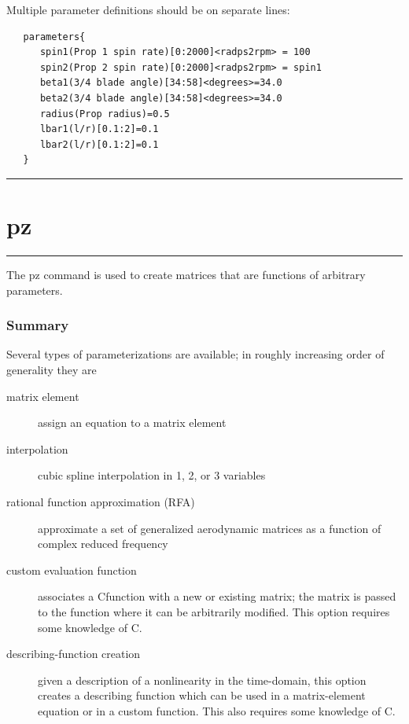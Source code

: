 \documentclass[11pt,openany,twoside]{book}
\makeatletter
\numberwithin{equation}{section}		%
\def\Cpp{{C\nolinebreak[4]\hspace{-.05em}\raisebox{.4ex}{\tiny\bf ++}}\:}
\newcommand{\Cmd}[1]{{\sf #1}}
\newcommand{\Manpg}[1]{
	\hspace{-\parindent}\rule[-5mm]{\textwidth}{0.3mm}
	\newpage
	\section[\Cmd{#1}]{\sf\Large{#1}} \label{ref:#1} \index{#1@\Cmd{#1}!reference}
	\rule[5mm]{\textwidth}{0.3mm}
}
\makeatother
\begin{document}
Multiple parameter definitions should be on separate lines:
\begin{lstlisting}
   parameters{
      spin1(Prop 1 spin rate)[0:2000]<radps2rpm> = 100
      spin2(Prop 2 spin rate)[0:2000]<radps2rpm> = spin1
      beta1(3/4 blade angle)[34:58]<degrees>=34.0
      beta2(3/4 blade angle)[34:58]<degrees>=34.0
      radius(Prop radius)=0.5
      lbar1(l/r)[0.1:2]=0.1
      lbar2(l/r)[0.1:2]=0.1
   }
\end{lstlisting}

\Manpg{pz}

The \Cmd{pz} command is used to create matrices
that are functions of arbitrary parameters.

\subsubsection{Summary}
Several types of parameterizations are available; in roughly increasing
order of generality they are

\begin{description}
\item[matrix element]
   assign an equation to a matrix element
        
\item[interpolation]
   cubic spline interpolation in 1, 2, or 3 variables

\item[rational function approximation (RFA)]
   approximate a set of generalized aerodynamic matrices
   as a function of complex reduced frequency
                        
\item[custom evaluation function]
   associates a \Cpp function with a new or existing matrix; the
   matrix is passed to the function where it can be arbitrarily modified.
   This option requires some knowledge of \Cpp.

\item[describing-function creation]
   given a description of a nonlinearity in the time-domain,
   this option creates a describing function which can be used in
   a matrix-element equation or in a custom function. This also
   requires some knowledge of \Cpp.
                
\end{description}
\end{document}

